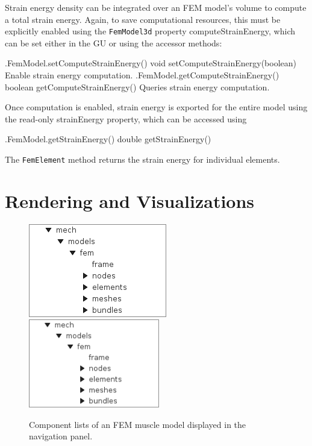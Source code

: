 Strain energy density can be integrated over an FEM model's volume to
compute a total strain energy. Again, to save computational resources,
this must be explicitly enabled using the {\tt FemModel3d} property
{\sf computeStrainEnergy}, which can be set either in the GU or
using the accessor methods:
%
\begin{methodtable}{0.45}{0.55}
%
\methodentry
{\fem.FemModel.setComputeStrainEnergy()}%
{void setComputeStrainEnergy(boolean)}%
{Enable strain energy computation.}%
%
\methodentry
{\fem.FemModel.getComputeStrainEnergy()}%
{boolean getComputeStrainEnergy()}%
{Queries strain energy computation.}%
%
\end{methodtable}
%
Once computation is enabled, strain energy is exported for the entire
model using the read-only {\sf strainEnergy} property, which
can be accessed using
\begin{methodtable}{0.5}{0.5}
%
\methodentry
{\fem.FemModel.getStrainEnergy()}%
{double getStrainEnergy()}%
{}%
%
\end{methodtable}
%
The {\tt FemElement}
method  returns the
strain energy for individual elements.

\section{Rendering and Visualizations}
\label{sec:fem:rendering}

\begin{figure}[h]
\begin{center}
\iflatexml
 \includegraphics[]{images/femNavPanel}
\else
 \includegraphics[width=2.25in]{images/femNavPanel}
\fi
\end{center}
\caption{Component lists of an FEM muscle model displayed 
in the navigation panel.}
\label{FemNavPanel:fig} 
\end{figure}

